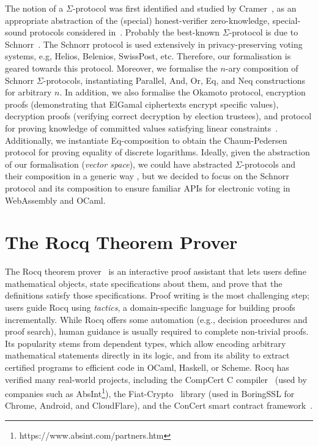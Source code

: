 \documentclass[sigconf,anonymous,review]{acmart}
\begin{document}
The notion of a $\Sigma$-protocol was first identified and studied by Cramer~\cite{cramer1996modular},
as an appropriate abstraction of the (special) honest-verifier zero-knowledge, special-sound protocols considered in~\cite{cramer1994proofs}.
Probably the best-known $\Sigma$-protocol is due to Schnorr~\cite{schnorr1991efficient}.
The Schnorr protocol is used extensively in privacy-preserving voting systems, e.g, Helios, Belenios, SwissPost, etc. Therefore, 
our formalisation is geared towards this protocol. Moreover, we formalise the $n$-ary composition of Schnorr $\Sigma$-protocols, instantiating Parallel, And, Or, Eq, and Neq constructions for arbitrary $n$. In addition, we also formalise the Okamoto protocol, encryption proofs (demonstrating that ElGamal ciphertexts encrypt specific values), decryption proofs (verifying correct decryption by election trustees), and protocol for proving knowledge of committed values satisfying linear constraints~\cite{Bra97}. Additionally, we instantiate Eq-composition to obtain the Chaum-Pedersen protocol for proving equality of discrete logarithms. Ideally, given the abstraction of our formalisation (\textit{vector space}), we could have 
abstracted $\Sigma$-protocols and their composition in a generic way \cite{10.1007/978-3-642-02384-2_17},
but we decided to focus on the Schnorr protocol and its composition to ensure familiar APIs 
for electronic voting in WebAssembly and OCaml.




\section{The Rocq Theorem Prover}\label{coq_theorem}
The Rocq theorem prover~\cite{the_coq_development_team} is an interactive proof assistant that lets users define mathematical objects, state specifications about them, and prove that the definitions satisfy those specifications. Proof writing is the most challenging step; users guide Rocq using \emph{tactics}, a domain-specific language for building proofs incrementally. While Rocq offers some automation (e.g., decision procedures and proof search), human guidance is usually required to complete non-trivial proofs. Its popularity stems from dependent types, which allow encoding arbitrary mathematical statements directly in its logic, and from its ability to extract certified programs to efficient code in OCaml, Haskell, or Scheme.  Rocq has verified many real-world projects, including the CompCert C compiler~\cite{10.1145/1111037.1111042} (used by companies such as AbsInt\footnote{https://www.absint.com/partners.htm}), the Fiat-Crypto~\cite{8835346} library (used in BoringSSL for Chrome, Android, and CloudFlare), and the ConCert smart contract framework~\cite{10.1145/3372885.3373829}.
\end{document}
